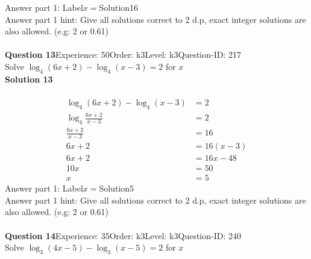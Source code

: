 \documentclass{article}
\begin{document}
Answer part 1: \hspace{10pt}Label\hspace{10pt}$x=$\hspace{10pt}Solution\hspace{10pt}16\\
Answer part 1 hint: \hspace{15pt}Give all solutions correct to 2 d.p, exact integer solutions are also allowed. (e.g: 2 or 0.61)\\
\\[4pt]
\noindent\textbf{Question 13}\hspace{20pt}Experience: 50\hspace{20pt}Order: k3\hspace{20pt}Level: k3\hspace{20pt}Question-ID: 217\\[2pt]
Solve $\log_{4}(6x+2)-\log_{4}(x-3)=2$ for $x$\\[4pt]
\noindent\textbf{Solution 13}\\[2pt]
\\[-35pt]\begin{align*}
\log_{4}(6x+2)-\log_{4}(x-3)&=2\\[2pt]
\log_{4}\displaystyle\frac{6x+2}{x-3}&=2\\[2pt]
\displaystyle\frac{6x+2}{x-3}&=16\\[2pt]
6x+2&=16(x-3)\\[2pt]
6x+2&=16x-48\\[2pt]
10x&=50\\[2pt]
x&=5
\end{align*}
Answer part 1: \hspace{10pt}Label\hspace{10pt}$x=$\hspace{10pt}Solution\hspace{10pt}5\\
Answer part 1 hint: \hspace{15pt}Give all solutions correct to 2 d.p, exact integer solutions are also allowed. (e.g: 2 or 0.61)\\
\\[4pt]
\noindent\textbf{Question 14}\hspace{20pt}Experience: 35\hspace{20pt}Order: k3\hspace{20pt}Level: k3\hspace{20pt}Question-ID: 240\\[2pt]
Solve $\log_{3}(4x-5)-\log_{3}(x-5)=2$ for $x$\\[4pt]
\end{document}
